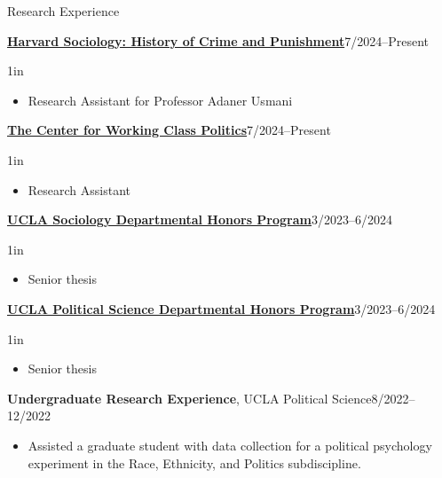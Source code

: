 \documentclass[12pt]{resume} %
\newcommand{\righthandindent}{1in}
\begin{document}
\begin{rSection}{Research Experience}

\href{https://sociology.fas.harvard.edu/}{\textbf{Harvard Sociology: History of Crime and Punishment}}\hfill 7/2024--Present
\begin{adjustwidth}{0pt}{\righthandindent}
\vspace{-7pt}
\begin{itemize}
    \item[] Research Assistant for Professor Adaner Usmani
\end{itemize}
\end{adjustwidth}

\href{https://www.workingclasspolitics.org/}{\textbf{The Center for Working Class Politics}}\hfill 7/2024--Present
\begin{adjustwidth}{0pt}{\righthandindent}
\vspace{-7pt}
\begin{itemize}
    \item[] Research Assistant
\end{itemize}
\end{adjustwidth}

\href{https://soc.ucla.edu/undergraduate-study/department-honors-program/}{\textbf{UCLA Sociology Departmental Honors Program}}\hfill{}3/2023--6/2024
\begin{adjustwidth}{0pt}{\righthandindent}
\vspace{-7pt}
\begin{itemize}
    \item[] Senior thesis
\end{itemize}
\end{adjustwidth}

\href{https://polisci.ucla.edu/academics/undergraduate/honors-program/}{\textbf{UCLA Political Science Departmental Honors Program}}\hfill{}3/2023--6/2024
\begin{adjustwidth}{0pt}{\righthandindent}
\vspace{-7pt}
\begin{itemize}
    \item[] Senior thesis
\end{itemize}
\end{adjustwidth}

\textbf{Undergraduate Research Experience}, UCLA Political Science\hfill{}8/2022--12/2022
\begin{adjustwidth}{0pt}{1.8in}
\vspace{-7pt}
\begin{itemize}
    \item[] Assisted a graduate student with data collection for a political psychology
experiment in the Race, Ethnicity, and Politics subdiscipline.
\end{itemize}
\end{adjustwidth}


\end{rSection}
\end{document}
